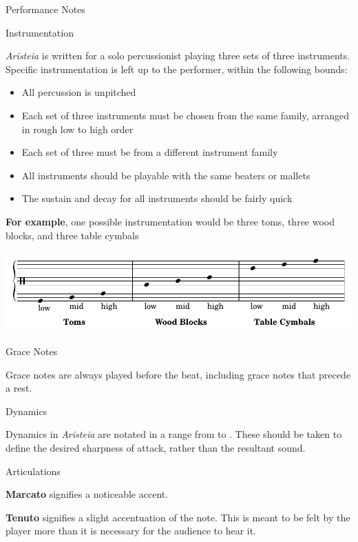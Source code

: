 \documentclass{article}
\begin{document}
\begin{center}
  {\Huge Performance Notes }
\end{center}

{\large Instrumentation}

\textit{Aristeia} is written for a solo percussionist playing three sets of three instruments.
Specific instrumentation is left up to the performer, within the following bounds:

\begin{itemize}
  \item All percussion is unpitched
  \item Each set of three instruments must be chosen from the same family, arranged in rough low to high order
  \item Each set of three must be from a different instrument family
  \item All instruments should be playable with the same beaters or mallets
  \item The sustain and decay for all instruments should be fairly quick
\end{itemize}

{\bf For example}, one possible instrumentation would be three toms, three wood blocks, and three table cymbals

\begin{center}
  \includegraphics[scale=.8]{./instruments-cropped.pdf}
\end{center}

{\large Grace Notes}

Grace notes are always played before the beat, including grace notes that precede a rest.

\vspace{1.5em}
{\large Dynamics}

Dynamics in \textit{Aristeia} are notated in a range from  to . These should be taken to define the desired sharpness of attack, rather than the resultant sound.
\pagebreak


{\large Articulations}

{\bf Marcato} signifies a noticeable accent.

{\bf Tenuto} signifies a slight accentuation of the note. This is meant to be felt by the player more than it is necessary for the audience to hear it.
\end{document}
